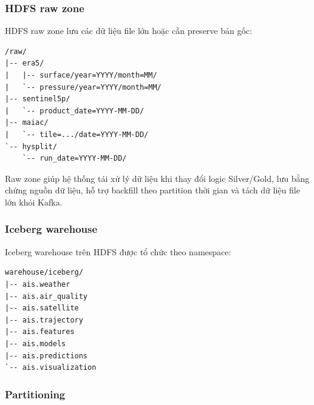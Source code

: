 \documentclass[12pt,a4paper]{article}
\begin{document}
\subsubsection{HDFS raw zone}\label{hdfs-raw-zone}

HDFS raw zone lưu các dữ liệu file lớn hoặc cần preserve bản gốc:

\begin{verbatim}
/raw/
|-- era5/
|   |-- surface/year=YYYY/month=MM/
|   `-- pressure/year=YYYY/month=MM/
|-- sentinel5p/
|   `-- product_date=YYYY-MM-DD/
|-- maiac/
|   `-- tile=.../date=YYYY-MM-DD/
`-- hysplit/
    `-- run_date=YYYY-MM-DD/
\end{verbatim}

Raw zone giúp hệ thống tái xử lý dữ liệu khi thay đổi logic Silver/Gold, lưu bằng chứng nguồn dữ liệu, hỗ trợ backfill theo partition thời gian và tách dữ liệu file lớn khỏi Kafka.

\subsubsection{Iceberg warehouse}\label{iceberg-warehouse}

Iceberg warehouse trên HDFS được tổ chức theo namespace:

\begin{verbatim}
warehouse/iceberg/
|-- ais.weather
|-- ais.air_quality
|-- ais.satellite
|-- ais.trajectory
|-- ais.features
|-- ais.models
|-- ais.predictions
`-- ais.visualization
\end{verbatim}

\subsubsection{Partitioning}\label{partitioning}
\end{document}
